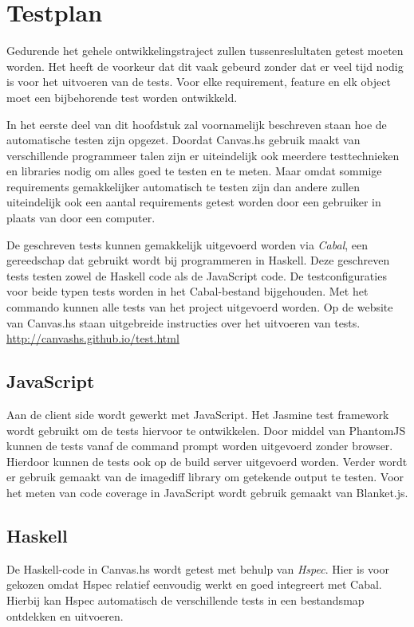 \chapter{Testplan} \label{hoofdstuk:testplan}
Gedurende het gehele ontwikkelingstraject zullen tussenreslultaten getest moeten worden. Het heeft de voorkeur dat dit vaak gebeurd zonder dat er veel tijd nodig is voor het uitvoeren van de tests. Voor elke requirement, feature en elk object moet een bijbehorende test worden ontwikkeld.

In het eerste deel van dit hoofdstuk zal voornamelijk beschreven staan hoe de automatische testen zijn opgezet. Doordat Canvas.hs gebruik maakt van verschillende programmeer talen zijn er uiteindelijk ook meerdere testtechnieken en libraries nodig om alles goed te testen en te meten. Maar omdat sommige requirements gemakkelijker automatisch te testen zijn dan andere zullen uiteindelijk ook een aantal requirements getest worden door een gebruiker in plaats van door een computer.

De geschreven tests kunnen gemakkelijk uitgevoerd worden via \emph{Cabal}, een gereedschap dat gebruikt wordt bij programmeren in Haskell. Deze geschreven tests testen zowel de Haskell code als de JavaScript code. De testconfiguraties voor beide typen tests worden in het Cabal-bestand bijgehouden. Met het commando  kunnen alle tests van het project uitgevoerd worden. Op de website van Canvas.hs staan uitgebreide instructies over het uitvoeren van tests. \url{http://canvashs.github.io/test.html}

\section{JavaScript} 
Aan de client side wordt gewerkt met JavaScript. Het Jasmine\cite{Jasmine} test framework wordt gebruikt om de tests hiervoor te ontwikkelen. Door middel van PhantomJS\cite{PhantomJS} kunnen de tests vanaf de command prompt worden uitgevoerd zonder browser. Hierdoor kunnen de tests ook op de build server uitgevoerd worden. Verder wordt er gebruik gemaakt van de imagediff\cite{imagediff} library om getekende output te testen. Voor het meten van code coverage in JavaScript wordt gebruik gemaakt van Blanket.js\cite{Blanket.js}.

\section{Haskell}
De Haskell-code in Canvas.hs wordt getest met behulp van \emph{Hspec}\cite{Hspec}. Hier is voor gekozen omdat Hspec relatief eenvoudig werkt en goed integreert met Cabal. Hierbij kan Hspec automatisch de verschillende tests in een bestandsmap ontdekken en uitvoeren.

